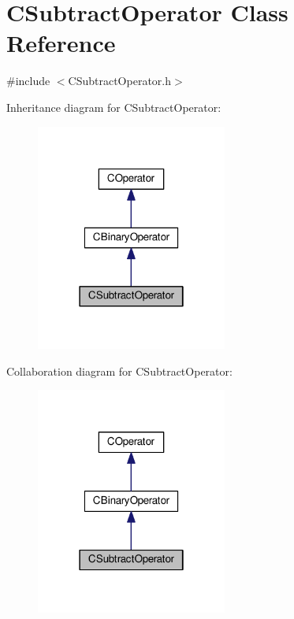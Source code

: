 \hypertarget{classCSubtractOperator}{}\section{C\+Subtract\+Operator Class Reference}
\label{classCSubtractOperator}


{\ttfamily \#include $<$C\+Subtract\+Operator.\+h$>$}



Inheritance diagram for C\+Subtract\+Operator\+:\nopagebreak
\begin{figure}[H]
\begin{center}
\leavevmode
\includegraphics[width=178pt]{classCSubtractOperator__inherit__graph}
\end{center}
\end{figure}


Collaboration diagram for C\+Subtract\+Operator\+:\nopagebreak
\begin{figure}[H]
\begin{center}
\leavevmode
\includegraphics[width=178pt]{classCSubtractOperator__coll__graph}
\end{center}
\end{figure}
